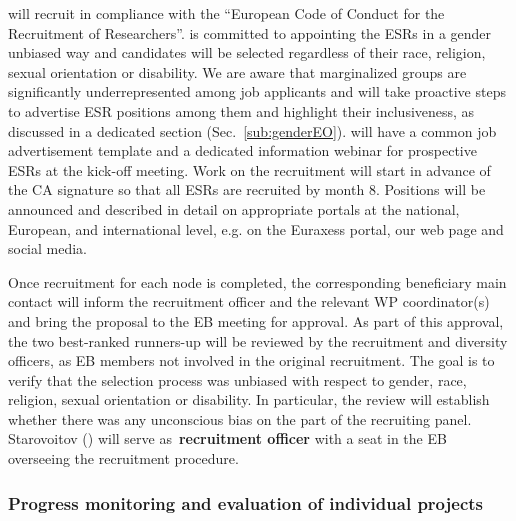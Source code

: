 \acronym will recruit in compliance with the ``European Code of Conduct for the Recruitment of Researchers''. 
\acronym is committed to appointing the ESRs in a gender unbiased way and candidates will be selected regardless of their race, religion, sexual orientation or disability. 
We are aware that marginalized groups are significantly underrepresented among job applicants and will take proactive steps to advertise \acronym ESR positions among them and highlight their inclusiveness, as discussed in a dedicated section (Sec.~\ref{sub:genderEO}).
\acronym will have a common job advertisement template and a dedicated information webinar for prospective ESRs at the kick-off meeting. Work on the recruitment will start in advance of the CA signature so that all ESRs are recruited by month 8.
Positions will be announced and described in detail on appropriate portals at the national, European, and international level, e.g.
on the Euraxess portal, our web page and social media.

Once recruitment for each node is completed, the corresponding beneficiary main contact will inform the recruitment officer and the relevant WP coordinator(s) and bring the proposal to the EB meeting for approval. 
As part of this approval, the two best-ranked runners-up will be reviewed by the recruitment and diversity officers, as EB members not involved in the original recruitment. 
The goal is to verify that the selection process was unbiased with respect to gender, race, religion, sexual orientation or disability. 
In particular, the review will establish whether there was any unconscious bias on the part of the recruiting panel. 
Starovoitov (\heidelbergshort) will serve as~\textbf{recruitment officer} with a seat in the EB overseeing the recruitment procedure. 

\vspace{-2mm}

\subsubsection{Progress monitoring and evaluation of individual projects}
\label{sub:progressMonitoring}
 

